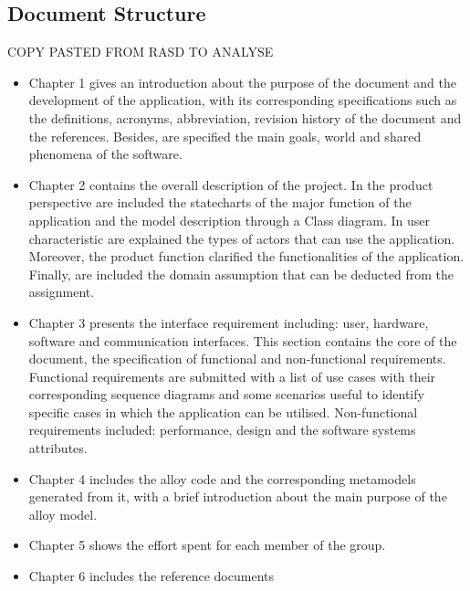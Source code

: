 \subsection{Document Structure}
COPY PASTED FROM RASD TO ANALYSE
\begin{itemize}

\item
Chapter 1 gives an introduction about the purpose of the document and the development of the
application, with its corresponding specifications such as the definitions, acronyms, abbreviation,
revision history of the document and the references.
Besides, are specified the main goals, world and shared phenomena of the software.

\item
Chapter 2 contains the overall description of the project. In the product perspective are included
the statecharts of the major function of the application and the model description through a Class
diagram. In user characteristic are explained the types of actors that can use the application.
Moreover, the product function clarified the functionalities of the application. Finally, are included
the domain assumption that can be deducted from the assignment.

\item
Chapter 3 presents the interface requirement including: user, hardware, software and
communication interfaces. This section contains the core of the document, the specification of
functional and non-functional requirements. Functional requirements are submitted with a list of
use cases with their corresponding sequence diagrams and some scenarios useful to identify
specific cases in which the application can be utilised. Non-functional requirements included:
performance, design and the software systems attributes.

\item
Chapter 4 includes the alloy code and the corresponding metamodels generated from it, with a
brief introduction about the main purpose of the alloy model.

\item
Chapter 5 shows the effort spent for each member of the group.

\item
Chapter 6 includes the reference documents
\end{itemize}

